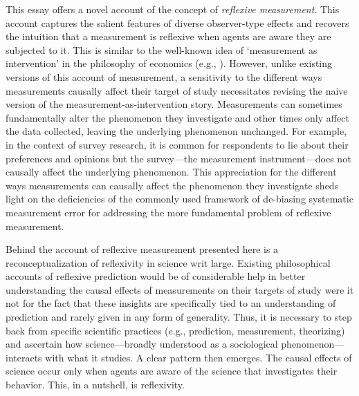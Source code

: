 This essay offers a novel account of the concept of \textit{reflexive measurement}. This account captures the salient features of diverse observer-type effects and recovers the intuition that a measurement is reflexive when agents are aware they are subjected to it. This is similar to the well-known idea of `measurement as intervention' in the philosophy of economics (e.g., \cite{morgan2001}). However, unlike existing versions of this account of measurement, a sensitivity to the different ways measurements causally affect their target of study necessitates revising the naive version of the measurement-as-intervention story. Measurements can sometimes fundamentally alter the phenomenon they investigate and other times only affect the data collected, leaving the underlying phenomenon unchanged. For example, in the context of survey research, it is common for respondents to lie about their preferences and opinions but the survey---the measurement instrument---does not causally affect the underlying phenomenon. This appreciation for the different ways measurements can causally affect the phenomenon they investigate sheds light on the deficiencies of the commonly used framework of de-biasing systematic measurement error for addressing the more fundamental problem of reflexive measurement.


Behind the account of reflexive measurement presented here is a reconceptualization of reflexivity in science writ large. Existing philosophical accounts of reflexive prediction would be of considerable help in better understanding the causal effects of measurements on their targets of study were it not for the fact that these insights are specifically tied to an understanding of prediction and rarely given in any form of generality. Thus, it is necessary to step back from specific scientific practices (e.g., prediction, measurement, theorizing) and ascertain how science---broadly understood as a sociological phenomenon---interacts with what it studies. A clear pattern then emerges. The causal effects of science occur only when agents are aware of the science that investigates their behavior. This, in a nutshell, is reflexivity.

